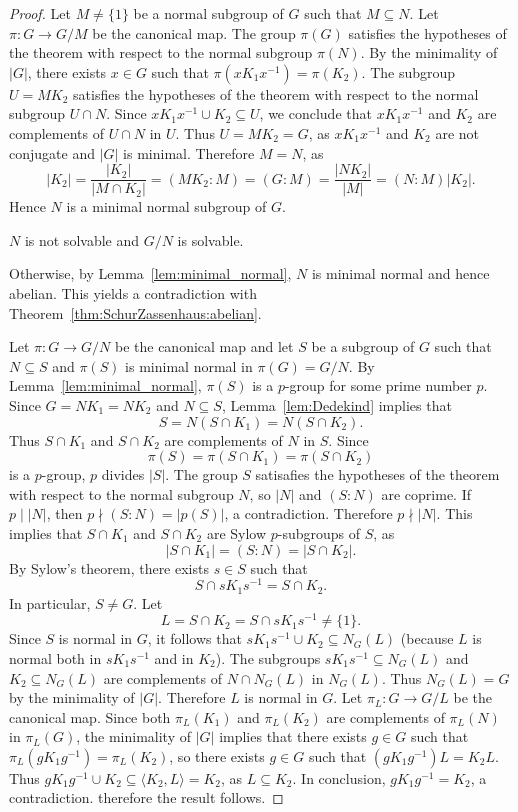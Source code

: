 \begin{proof}
	Let $M\ne\{1\}$ be a normal subgroup of $G$ such that $M\subseteq N$. Let $\pi\colon G\to G/M$
	be the canonical map. The group $\pi(G)$ satisfies the hypotheses of the theorem
	with respect to the normal subgroup $\pi(N)$. By the minimality of $|G|$, there exists 
	$x\in G$ such that $\pi(xK_1x^{-1})=\pi(K_2)$. The subgroup 
	$U=MK_2$ satisfies the hypotheses of the theorem with respect to the normal subgroup 
	$U\cap N$. Since $xK_1x^{-1}\cup K_2\subseteq U$,
	we conclude that $xK_1x^{-1}$ and $K_2$ are complements of $U\cap N$ in $U$.
	Thus $U=MK_2=G$, as $xK_1x^{-1}$ and $K_2$ are not conjugate and $|G|$ is minimal. 
	Therefore $M=N$, as  
	\[
		|K_2|=\frac{|K_2|}{|M\cap K_2|}=(MK_2:M)=(G:M)=\frac{|NK_2|}{|M|}=(N:M)|K_2|.
	\]
    Hence $N$ is a minimal normal subgroup of $G$.
    
	\begin{claim}
		$N$ is not solvable and $G/N$ is solvable. 
	\end{claim}
	
	Otherwise, by Lemma~\ref{lem:minimal_normal}, 	$N$ is minimal normal
	and hence abelian. This yields a contradiction with Theorem~\ref{thm:SchurZassenhaus:abelian}. 
	
	\medskip
	Let $\pi\colon G\to G/N$ be the canonical map and let $S$ be a subgroup of $G$ such that $N\subseteq S$ and $\pi(S)$
	is minimal normal in $\pi(G)=G/N$.  By Lemma~\ref{lem:minimal_normal},
	$\pi(S)$ is a $p$-group for some prime number $p$.  Since $G=NK_1=NK_2$ and $N\subseteq
	S$, Lemma~\ref{lem:Dedekind} implies that  
	\[
	S=N(S\cap K_1)=N(S\cap K_2).
	\]
	Thus $S\cap K_1$ and $S\cap K_2$
	are complements of $N$ in $S$. Since 
	\[
	\pi(S)=\pi(S\cap K_1)=\pi(S\cap K_2)
	\]
	is a $p$-group,
	$p$ divides $|S|$. The group $S$ 
	satisafies the hypotheses of the theorem 
	with respect to the normal subgroup $N$,
	so $|N|$ and $(S:N)$ are coprime. If $p\mid |N|$, then  
	$p\nmid (S:N)=|p(S)|$, a contradiction. Therefore $p\nmid |N|$. 
	This implies that $S\cap K_1$ and $S\cap K_2$ are
	Sylow $p$-subgroups of $S$, as 
	\[
		|S\cap K_1|=(S:N)=|S\cap K_2|.
	\]
	By Sylow's theorem, there exists $s\in
	S$ such that 
	\[
	S\cap sK_1s^{-1}=S\cap K_2.
	\]
	In particular, $S\ne G$.
	Let  
	\[
		L=S\cap K_2=S\cap sK_1s^{-1}\ne\{1\}.
	\]
	Since $S$ is normal in $G$, it follows that $sK_1s^{-1}\cup K_2\subseteq N_G(L)$ (because $L$
	is normal both in $sK_1s^{-1}$ and in $K_2$). The subgroups $sK_1s^{-1}\subseteq
	N_G(L)$ and $K_2\subseteq N_G(L)$ are complements of $N\cap N_G(L)$ in $N_G(L)$. Thus 
	$N_G(L)=G$ by the minimality of $|G|$. Therefore 
	$L$ is normal in $G$. 
	Let $\pi_L\colon G\to G/L$ be the canonical map. Since both 
	$\pi_L(K_1)$ and $\pi_L(K_2)$ are complements of $\pi_L(N)$ in $\pi_L(G)$, the minimality 
	of $|G|$ implies that there exists $g\in G$ such that $\pi_L(gK_1g^{-1})=\pi_L(K_2)$, so  
	there exists $g\in G$ such that $(gK_1g^{-1})L=K_2L$.  Thus $gK_1g^{-1}\cup
	K_2\subseteq \langle K_2,L\rangle=K_2$, as $L\subseteq K_2$. In conclusion,	
	$gK_1g^{-1}=K_2$, a contradiction. therefore the result follows. 
\end{proof}




